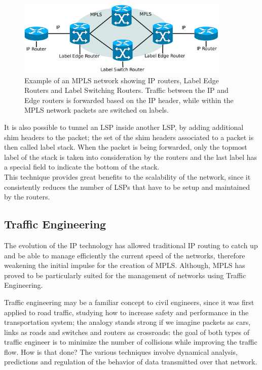 \documentclass[10pt,a4paper]{report}
\begin{document}
\begin{figure}[!hbp]
  \centering
  \includegraphics[width=0.9\textwidth]{img/mpls_net}
  \caption[MPLS network]{Example of an MPLS network showing IP
    routers, Label Edge Routers and Label Switching Routers. Traffic
    between the IP and Edge routers is forwarded based on the IP
    header, while within the MPLS network packets are switched on
    labels.}
  \label{fig:mpls_net}
\end{figure}

\newpage

It is also possible to tunnel an LSP inside another LSP, by adding
additional shim headers to the packet; the set of the shim headers
associated to a packet is then called label stack. When the packet is
being forwarded, only the topmost label of the stack is taken into
consideration by the routers and the last label has a special field to
indicate the bottom of the stack. \\
This technique provides great benefits to the scalability of the
network, since it consistently reduces the number of LSPs that have to
be setup and maintained by the routers.

\subsection{Traffic Engineering}
The evolution of the IP technology has allowed traditional IP routing
to catch up and be able to manage efficiently the current speed of the
networks, therefore weakening the initial impulse for the creation of
MPLS\@. Although, MPLS has proved to be particularly suited for the
management of networks using Traffic Engineering.

Traffic engineering may be a familiar concept to civil engineers,
since it was first applied to road traffic, studying how to increase
safety and performance in the transportation system; the analogy
stands strong if we imagine packets as cars, links as roads and
switches and routers as crossroads: the goal of both types of traffic
engineer is to minimize the number of collisions while improving the
traffic flow. How is that done? The various techniques involve
dynamical analysis, predictions and regulation of the behavior of data
transmitted over that network.
\end{document}
